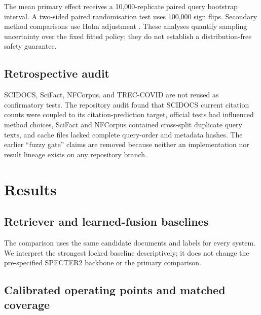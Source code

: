 \documentclass[11pt]{article}
\begin{document}
The mean primary effect receives a 10,000-replicate paired query bootstrap
interval.  A two-sided paired randomisation test uses 100,000 sign flips.  Secondary
method comparisons use Holm adjustment \citep{holm1979}.  These analyses quantify
sampling uncertainty over the fixed fitted policy; they do not establish a
distribution-free safety guarantee.

\subsection{Retrospective audit}

SCIDOCS, SciFact, NFCorpus, and TREC-COVID are not reused as confirmatory tests.  The
repository audit found that SCIDOCS current citation counts were coupled to its
citation-prediction target, official tests had influenced method choices, SciFact and
NFCorpus contained cross-split duplicate query texts, and cache files lacked complete
query-order and metadata hashes.  The earlier ``fuzzy gate'' claims are removed
because neither an implementation nor result lineage exists on any repository branch.

\section{Results}

\subsection{Retriever and learned-fusion baselines}


The comparison uses the same candidate documents and labels for every system.  We
interpret the strongest locked baseline descriptively; it does not change the
pre-specified SPECTER2 backbone or the primary comparison.

\subsection{Calibrated operating points and matched coverage}

\end{document}
